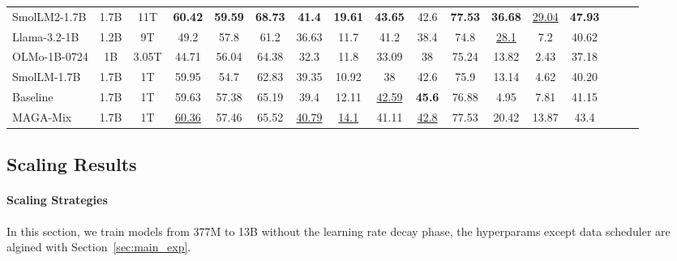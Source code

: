 \begin{table*}[h]
\begin{adjustbox}{max width=\textwidth}
{\begin{tabular}{@{\extracolsep{\fill}}lcccccccccccccccc}
      SmolLM2-1.7B & 1.7B & 11T & \textbf{60.42} & \textbf{59.59} & \textbf{68.73} & \textbf{41.4} & \textbf{19.61} & \textbf{43.65} & 42.6 & \textbf{77.53} & \textbf{36.68} & \underline{29.04} & \textbf{47.93} \\
      Llama-3.2-1B & 1.2B & 9T & 49.2 & 57.8 & 61.2 & 36.63 & 11.7 & 41.2 & 38.4 & 74.8 & \underline{28.1} & 7.2 & 40.62 \\
      OLMo-1B-0724 & 1B & 3.05T & 44.71 & 56.04 & 64.38 & 32.3 & 11.8 & 33.09 & 38 & 75.24 & 13.82 & 2.43 & 37.18 \\
      SmolLM-1.7B & 1.7B & 1T & 59.95 & 54.7 & 62.83 & 39.35 & 10.92 & 38 & 42.6 & 75.9 & 13.14 & 4.62 & 40.20 \\
      Baseline & 1.7B & 1T & 59.63 & 57.38 & 65.19 & 39.4 & 12.11 & \underline{42.59} & \textbf{45.6} & 76.88 & 4.95 & 7.81 & 41.15 \\
      MAGA-Mix & 1.7B & 1T & \colorbox{green!15}{\underline{60.36}} & \colorbox{green!15}{57.46} & \colorbox{green!15}{65.52} & \colorbox{green!15}{\underline{40.79}} & \colorbox{green!15}{\underline{14.1}} & 41.11 & \underline{42.8} & \colorbox{green!15}{77.53} & \colorbox{green!15}{20.42} & \colorbox{green!15}{13.87} & \colorbox{green!15}{43.4} \\
    \bottomrule
    \end{tabular}
    }
    \end{adjustbox}
    \label{tab:main_exp}

\end{table*}
\vspace{-1em}

\subsection{Scaling Results}
\label{sec:scaling_exp}
\vspace{-0.5em}

\paragraph{Scaling Strategies}
In this section, we train models from 377M to 13B without the learning rate decay phase,
the hyperparams except data scheduler are algined with Section~\ref{sec:main_exp}.


